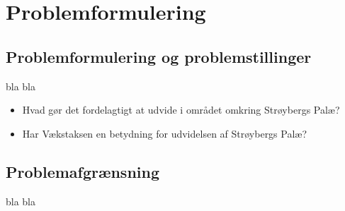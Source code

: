\chapter{Problemformulering}

\section{Problemformulering og problemstillinger}
bla bla
\begin{itemize} 
	\item Hvad gør det fordelagtigt at udvide i området omkring Strøybergs Palæ? 
	\item Har Vækstaksen en betydning for udvidelsen af Strøybergs Palæ? 
\end{itemize} 

\section{Problemafgrænsning}
bla bla